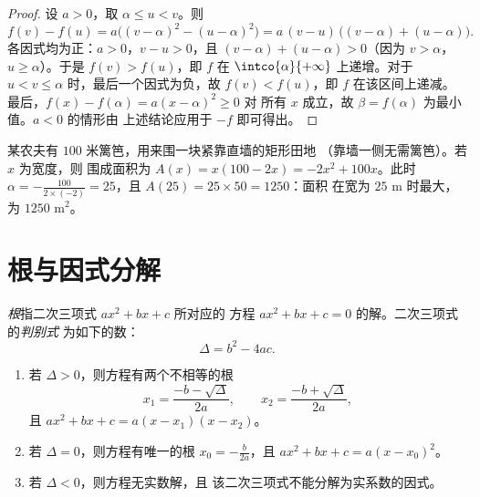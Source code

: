 \begin{proof}
设 $a > 0$，取 $\alpha \leq u < v$。则
\[
f(v) - f(u) = a\bigl((v-\alpha)^2 - (u-\alpha)^2\bigr)
= a\,(v - u)\,\bigl((v-\alpha) + (u-\alpha)\bigr).
\]
各因式均为正：$a > 0$，$v - u > 0$，且
$(v-\alpha) + (u-\alpha) > 0$（因为 $v > \alpha$，$u \geq \alpha$）。于是
$f(v) > f(u)$，即 $f$ 在 $\intco{\alpha}{+\infty}$ 上递增。对于
$u < v \leq \alpha$ 时，最后一个因式为负，故 $f(v) < f(u)$，即 $f$
在该区间上递减。最后，$f(x) - f(\alpha) = a(x-\alpha)^2 \geq 0$ 对
所有 $x$ 成立，故 $\beta = f(\alpha)$ 为最小值。$a < 0$ 的情形由
上述结论应用于 $-f$ 即可得出。
\end{proof}

\begin{example}
某农夫有 $100$ 米篱笆，用来围一块紧靠直墙的矩形田地
（靠墙一侧无需篱笆）。若 $x$ 为宽度，则
围成面积为 $A(x) = x(100 - 2x) = -2x^2 + 100x$。此时 $\alpha =
-\frac{100}{2\times(-2)} = 25$，且 $A(25) = 25 \times 50 = 1250$：面积
在宽为 $25$ m 时最大，为 $1250$ m$^2$。
\end{example}

\section{根与因式分解}

\begin{definition}[根、判别式]\label{def:g11:quad:discriminant}
\emph{根}指二次三项式 $ax^2+bx+c$ 所对应的
方程 $ax^2 + bx + c = 0$ 的解。二次三项式的\emph{判别式}
为如下的数：
\[
\Delta = b^2 - 4ac .
\]
\end{definition}

\begin{theorem}[解方程 $ax^2+bx+c=0$]\label{thm:g11:quad:roots}
\begin{enumerate}
  \item 若 $\Delta > 0$，则方程有两个不相等的根
        \[
        x_1 = \frac{-b - \sqrt{\Delta}}{2a},
        \qquad
        x_2 = \frac{-b + \sqrt{\Delta}}{2a},
        \]
        且 $ax^2+bx+c = a(x - x_1)(x - x_2)$。
  \item 若 $\Delta = 0$，则方程有唯一的根
        $x_0 = -\frac{b}{2a}$，且 $ax^2+bx+c = a(x - x_0)^2$。
  \item 若 $\Delta < 0$，则方程无实数解，且
        该二次三项式不能分解为实系数的因式。
\end{enumerate}
\end{theorem}

